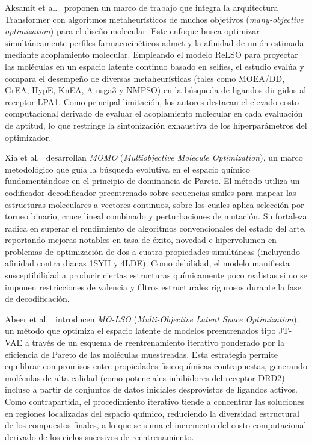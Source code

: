 Aksamit et al.~\cite{Aksamit2024} proponen un marco de trabajo que integra la arquitectura Transformer con algoritmos metaheurísticos de muchos objetivos (\textit{many-objective optimization}) para el diseño molecular. Este enfoque busca optimizar simultáneamente perfiles farmacocinéticos \gls{admet} y la afinidad de unión estimada mediante acoplamiento molecular. Empleando el modelo ReLSO para proyectar las moléculas en un espacio latente continuo basado en \gls{selfies}, el estudio evalúa y compara el desempeño de diversas metaheurísticas (tales como MOEA/DD, GrEA, HypE, KnEA, A-\acrshort{nsga3} y NMPSO) en la búsqueda de ligandos dirigidos al receptor LPA1. Como principal limitación, los autores destacan el elevado costo computacional derivado de evaluar el acoplamiento molecular en cada evaluación de aptitud, lo que restringe la sintonización exhaustiva de los hiperparámetros del optimizador.

Xia et al.~\cite{XZZ+24} desarrollan \textit{MOMO} (\textit{Multiobjective Molecule Optimization}), un marco metodológico que guía la búsqueda evolutiva en el espacio químico fundamentándose en el principio de dominancia de Pareto. El método utiliza un codificador-decodificador preentrenado sobre secuencias \gls{smiles} para mapear las estructuras moleculares a vectores continuos, sobre los cuales aplica selección por torneo binario, cruce lineal combinado y perturbaciones de mutación. Su fortaleza radica en superar el rendimiento de algoritmos convencionales del estado del arte, reportando mejoras notables en tasa de éxito, novedad e hipervolumen en problemas de optimización de dos a cuatro propiedades simultáneas (incluyendo afinidad contra dianas 1SYH y 4LDE). Como debilidad, el modelo manifiesta susceptibilidad a producir ciertas estructuras químicamente poco realistas si no se imponen restricciones de valencia y filtros estructurales rigurosos durante la fase de decodificación.

Abeer et al.~\cite{Abeer2024} introducen \textit{MO-LSO} (\textit{Multi-Objective Latent Space Optimization}), un método que optimiza el espacio latente de modelos preentrenados tipo JT-VAE a través de un esquema de reentrenamiento iterativo ponderado por la eficiencia de Pareto de las moléculas muestreadas. Esta estrategia permite equilibrar compromisos entre propiedades fisicoquímicas contrapuestas, generando moléculas de alta calidad (como potenciales inhibidores del receptor DRD2) incluso a partir de conjuntos de datos iniciales desprovistos de ligandos activos. Como contrapartida, el procedimiento iterativo tiende a concentrar las soluciones en regiones localizadas del espacio químico, reduciendo la diversidad estructural de los compuestos finales, a lo que se suma el incremento del costo computacional derivado de los ciclos sucesivos de reentrenamiento.

